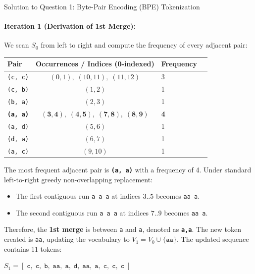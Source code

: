 \documentclass[11pt,a4paper]{article}
\begin{document}
\begin{solutionbox}{Solution to Question 1: Byte-Pair Encoding (BPE) Tokenization}
\paragraph{Iteration 1 (Derivation of 1st Merge):}
We scan $S_0$ from left to right and compute the frequency of every adjacent pair:
\begin{center}
\begin{tabular}{lclc}
\toprule
\textbf{Pair} & \textbf{Occurrences / Indices (0-indexed)} & \textbf{Frequency} \\
\midrule
\texttt{(c, c)} & $(0,1),\; (10,11),\; (11,12)$ & 3 \\
\texttt{(c, b)} & $(1,2)$ & 1 \\
\texttt{(b, a)} & $(2,3)$ & 1 \\
\textbf{\texttt{(a, a)}} & $\mathbf{(3,4),\; (4,5),\; (7,8),\; (8,9)}$ & \textbf{4} \\
\texttt{(a, d)} & $(5,6)$ & 1 \\
\texttt{(d, a)} & $(6,7)$ & 1 \\
\texttt{(a, c)} & $(9,10)$ & 1 \\
\bottomrule
\end{tabular}
\end{center}
The most frequent adjacent pair is \textbf{\texttt{(a, a)}} with a frequency of 4.
Under standard left-to-right greedy non-overlapping replacement:
\begin{itemize}[noitemsep]
    \item The first contiguous run \texttt{a a a} at indices $3..5$ becomes \texttt{aa a}.
    \item The second contiguous run \texttt{a a a} at indices $7..9$ becomes \texttt{aa a}.
\end{itemize}
Therefore, the \textbf{1st merge} is between \texttt{a} and \texttt{a}, denoted as \textbf{\texttt{a,a}}.
The new token created is \texttt{aa}, updating the vocabulary to $V_1 = V_0 \cup \{\texttt{aa}\}$.
The updated sequence contains 11 tokens:
\begin{center}
$S_1 = [\;\texttt{c},\; \texttt{c},\; \texttt{b},\; \texttt{aa},\; \texttt{a},\; \texttt{d},\; \texttt{aa},\; \texttt{a},\; \texttt{c},\; \texttt{c},\; \texttt{c}\;]$
\end{center}


\end{solutionbox}
\end{document}
